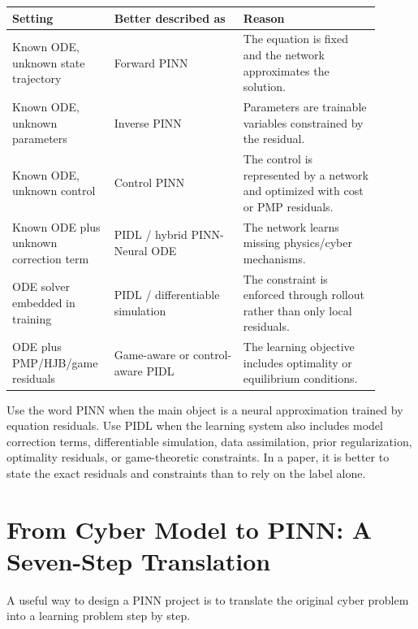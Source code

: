 \documentclass[11pt,a4paper]{article}
\begin{document}
\begin{longtable}{p{0.22\linewidth}p{0.33\linewidth}p{0.35\linewidth}}
\toprule
Setting & Better described as & Reason \\
\midrule
Known ODE, unknown state trajectory & Forward PINN & The equation is fixed and the network approximates the solution. \\
Known ODE, unknown parameters & Inverse PINN & Parameters are trainable variables constrained by the residual. \\
Known ODE, unknown control & Control PINN & The control is represented by a network and optimized with cost or PMP residuals. \\
Known ODE plus unknown correction term & PIDL / hybrid PINN-Neural ODE & The network learns missing physics/cyber mechanisms. \\
ODE solver embedded in training & PIDL / differentiable simulation & The constraint is enforced through rollout rather than only local residuals. \\
ODE plus PMP/HJB/game residuals & Game-aware or control-aware PIDL & The learning objective includes optimality or equilibrium conditions. \\
\bottomrule
\end{longtable}

\begin{takeaway}
Use the word PINN when the main object is a neural approximation trained by equation residuals. Use PIDL when the learning system also includes model correction terms, differentiable simulation, data assimilation, prior regularization, optimality residuals, or game-theoretic constraints. In a paper, it is better to state the exact residuals and constraints than to rely on the label alone.
\end{takeaway}


\section{From Cyber Model to PINN: A Seven-Step Translation}

A useful way to design a PINN project is to translate the original cyber problem into a learning problem step by step.
\end{document}
